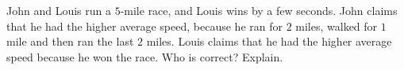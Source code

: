 John and Louis run a $5$-mile race, and Louis wins by a few seconds. John claims that he had the higher average speed, because he ran for $2$ miles, walked for $1$ mile and then ran the last $2$ miles. Louis claims that he had the higher average speed because he won the race. Who is correct? Explain.
